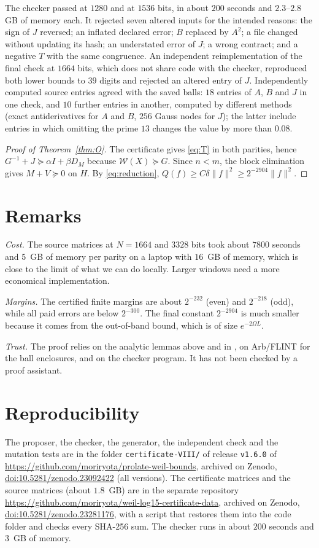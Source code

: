 \documentclass[11pt]{amsart}
\newcommand{\doi}[1]{\href{https://doi.org/#1}{doi:#1}}
\theoremstyle{remark}
\numberwithin{equation}{section}
\begin{document}
The checker passed at $1280$ and at $1536$ bits, in about $200$ seconds and $2.3$--$2.8$ GB of memory each. It rejected seven altered inputs for the intended reasons: the sign of $J$ reversed; an inflated declared error; $B$ replaced by $A^2$; a file changed without updating its hash; an understated error of $J$; a wrong contract; and a negative $T$ with the same congruence. An independent reimplementation of the final check at $1664$ bits, which does not share code with the checker, reproduced both lower bounds to $39$ digits and rejected an altered entry of $J$. Independently computed source entries agreed with the saved balls: $18$ entries of $A$, $B$ and $J$ in one check, and $10$ further entries in another, computed by different methods (exact antiderivatives for $A$ and $B$, $256$ Gauss nodes for $J$); the latter include entries in which omitting the prime $13$ changes the value by more than $0.08$.

\begin{proof}[Proof of Theorem~\ref{thm:O}]
The certificate gives \eqref{eq:T} in both parities, hence $G^{-1}+J\succeq\alpha I+\beta D_M$ because $\mathcal W(X)\succeq G$. Since $n<m$, the block elimination gives $M+V\succeq0$ on $H$. By \eqref{eq:reduction}, $Q(f)\ge C\delta\|f\|^2\ge2^{-2904}\|f\|^2$.
\end{proof}

\section{Remarks}
\emph{Cost.} The source matrices at $N=1664$ and $3328$ bits took about $7800$ seconds and $5$~GB of memory per parity on a laptop with $16$~GB of memory, which is close to the limit of what we can do locally. Larger windows need a more economical implementation.

\emph{Margins.} The certified finite margins are about $2^{-232}$ (even) and $2^{-218}$ (odd), while all paid errors are below $2^{-300}$. The final constant $2^{-2904}$ is much smaller because it comes from the out-of-band bound, which is of size $e^{-2\Omega L}$.

\emph{Trust.} The proof relies on the analytic lemmas above and in \cite{MoriVI,MoriVII}, on Arb/FLINT \cite{Arb} for the ball enclosures, and on the checker program. It has not been checked by a proof assistant.

\section*{Reproducibility}
The proposer, the checker, the generator, the independent check and the mutation tests are in the folder \texttt{certificate-VIII/} of release \texttt{v1.6.0} of \url{https://github.com/moriryota/prolate-weil-bounds}, archived on Zenodo, \doi{10.5281/zenodo.23092422} (all versions). The certificate matrices and the source matrices (about $1.8$~GB) are in the separate repository \url{https://github.com/moriryota/weil-log15-certificate-data}, archived on Zenodo, \doi{10.5281/zenodo.23281176}, with a script that restores them into the code folder and checks every SHA-256 sum. The checker runs in about $200$ seconds and $3$~GB of memory.
\end{document}
